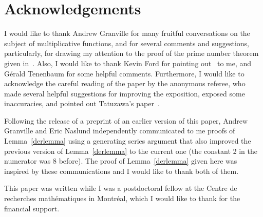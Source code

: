 \documentclass[12pt]{amsart}
\theoremstyle{remark}
\numberwithin{equation}{section}
\begin{document}


\section*{Acknowledgements}

I would like to thank Andrew Granville for many fruitful conversations on the subject of multiplicative functions, and for several comments and suggestions, particularly, for drawing my attention to the proof of the prime number theorem given in~\cite[pp. 40-42]{ik}. Also, I would like to thank Kevin Ford for pointing out~\cite[Corollary 2A]{Fo} to me, and G\'erald Tenenbaum for some helpful comments. Furthermore, I would like to acknowledge the careful reading of the paper by the anonymous referee, who made several helpful suggestions for improving the exposition, exposed some inaccuracies, and pointed out Tatuzawa's paper~\cite{Ta}.

Following the release of a preprint of an earlier version of this paper, Andrew Granville and Eric Naslund independently communicated to me proofs of Lemma~\ref{derlemma} using a generating series argument that also improved the previous version of Lemma~\ref{derlemma} to the current one (the constant 2 in the numerator was 8 before). The proof of Lemma~\ref{derlemma} given here was inspired by these communications and I would like to thank both of them.

This paper was written while I was a postdoctoral fellow at the Centre de recherches math\'ematiques in Montr\'eal, which I would like to thank for the financial support.

\end{document}
